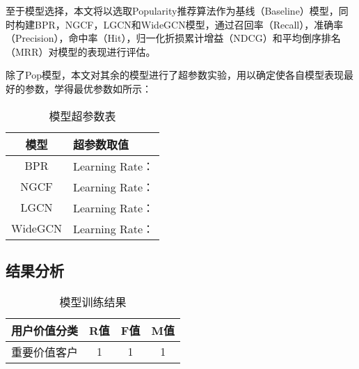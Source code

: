 \documentclass[lang=cn,11pt,a4paper,cite=authoryear]{elegantpaper}
\begin{document}
至于模型选择，本文将以选取Popularity推荐算法作为基线（Baseline）模型，同时构建BPR，NGCF，LGCN和WideGCN模型，通过召回率（Recall），准确率（Precision），命中率（Hit），归一化折损累计增益（NDCG）和平均倒序排名（MRR）对模型的表现进行评估。

除了Pop模型，本文对其余的模型进行了超参数实验，用以确定使各自模型表现最好的参数，学得最优参数如所示：
\begin{center}
  \begin{longtable}{c|l}
    \caption{模型超参数表}
    \label{超参数表}\\
      \hline
      \textbf{模型} & \textbf{超参数取值} \\
      \hline
      BPR & Learning Rate： \\
      NGCF & Learning Rate： \\
      LGCN & Learning Rate： \\
      WideGCN & Learning Rate： \\
      \hline
  \end{longtable}
  \end{center}



\subsection{结果分析}

\begin{center}
  \begin{longtable}{c|c|c|c}
    \caption{模型训练结果}
    \label{模型训练结果}\\
      \hline
      \textbf{用户价值分类} & \textbf{R值} & \textbf{F值} & \textbf{M值} \\
      \hline
      重要价值客户 & 1 & 1 & 1 \\
      \hline
  \end{longtable}
  \end{center}
\end{document}
